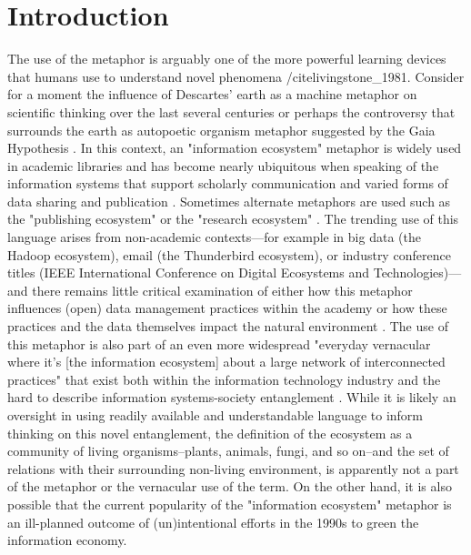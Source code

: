 \section{Introduction}

The use of the metaphor is arguably one of the more powerful learning devices that humans use to understand novel phenomena /cite{livingstone_1981}. Consider for a moment the influence of Descartes' earth as a machine metaphor on scientific thinking over the last several centuries \cite{abram_1991} or perhaps the controversy that surrounds the earth as autopoetic organism metaphor suggested by the Gaia Hypothesis \cite{lovelock_1974}. In this context, an "information ecosystem" metaphor is widely used in academic libraries and has become nearly ubiquitous when speaking of the information systems that support scholarly communication and varied forms of data sharing and publication \cite[for example see][]{walter_2008}. Sometimes alternate metaphors are used such as the "publishing ecosystem" or the "research ecosystem" \cite[for respective examples see][]{esposito_2013,dylla_2016}. The trending use of this language arises from non-academic contexts—for example in big data (the Hadoop ecosystem), email (the Thunderbird ecosystem), or industry conference titles (IEEE International Conference on Digital Ecosystems and Technologies)—and there remains little critical examination of either how this metaphor influences (open) data management practices within the academy or how these practices and the data themselves impact the natural environment \cite[although see][]{stepp_1999}. The use of this metaphor is also part of an even more widespread "everyday vernacular where it’s [the information ecosystem] about a large network of interconnected practices" that exist both within the information technology industry and the hard to describe information systems-society entanglement \cite{boyd_2016}. While it is likely an oversight in using readily available and understandable language to inform thinking on this novel entanglement, the definition of the ecosystem as a community of living organisms--plants, animals, fungi, and so on--and the set of relations with their surrounding non-living environment, is apparently not a part of the metaphor or the vernacular use of the term. On the other hand, it is also possible that the current popularity of the "information ecosystem" metaphor is an ill-planned outcome of (un)intentional efforts in the 1990s to green the information economy.

